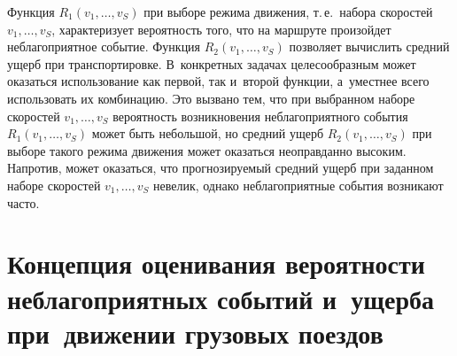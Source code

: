\begin{multicols}{2}
     Функция $R_1(v_1, \ldots , v_S)$ при выборе режима движения, т.\,е.\ набора 
скоростей $v_1, \ldots , v_S$, характеризует ве\-ро\-ят\-ность того, что на маршруте 
произойдет неблагоприятное событие. Функ\-ция $R_2(v_1, \ldots , v_S)$ позволяет 
вы\-чис\-лить сред\-ний ущерб при транспортировке. В~конкретных задачах 
целесообразным может оказаться использование как первой, так и~второй 
функции, а~умест\-нее всего использовать их комбинацию. Это вызвано тем, что 
при выбранном наборе скоростей $v_1, \ldots , v_S$ ве\-ро\-ят\-ность возникновения 
неблагоприятного события $R_1(v_1, \ldots , v_S)$ может быть небольшой, но 
сред\-ний ущерб $R_2(v_1, \ldots , v_S)$ при выборе такого режима движения может 
оказаться неоправданно высоким. Напротив, может оказаться, что 
прог\-но\-зи\-ру\-емый сред\-ний ущерб при заданном наборе скоростей $v_1, \ldots , v_S$ 
невелик, однако неблагоприятные события возникают \mbox{часто}.

\section{Концепция оценивания вероятности неблагоприятных событий 
и~ущерба при~движении грузовых поездов}


\end{multicols}
